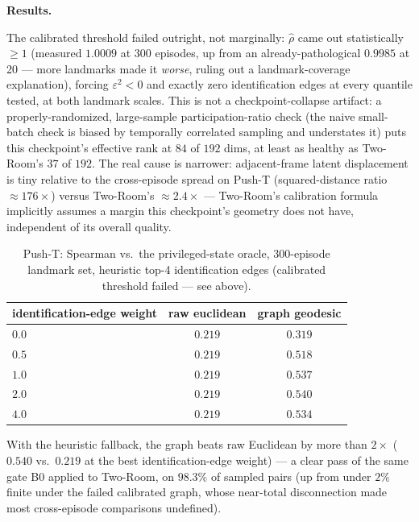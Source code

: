 \documentclass[11pt]{article}
\begin{document}
\textbf{Results.}

The calibrated threshold failed outright, not marginally: $\hat\rho$ came out statistically
$\ge 1$ (measured $1.0009$ at 300 episodes, up from an already-pathological $0.9985$ at 20 ---
more landmarks made it \emph{worse}, ruling out a landmark-coverage explanation), forcing
$\varepsilon^2 < 0$ and exactly zero identification edges at every quantile tested, at both
landmark scales. This is not a checkpoint-collapse artifact: a properly-randomized,
large-sample participation-ratio check (the naive small-batch check is biased by temporally
correlated sampling and understates it) puts this checkpoint's effective rank at $84$ of $192$
dims, at least as healthy as Two-Room's $37$ of $192$. The real cause is narrower: adjacent-frame
latent displacement is tiny relative to the cross-episode spread on Push-T (squared-distance
ratio $\approx 176\times$) versus Two-Room's $\approx 2.4\times$ --- Two-Room's calibration
formula implicitly assumes a margin this checkpoint's geometry does not have, independent of its
overall quality.

\begin{table}[h]
\centering
\small
\caption{Push-T: Spearman vs.\ the privileged-state oracle, 300-episode landmark set,
heuristic top-4 identification edges (calibrated threshold failed --- see above).}
\begin{tabular}{lcc}
\toprule
identification-edge weight & raw euclidean & \textbf{graph geodesic} \\
\midrule
$0.0$ & $0.219$ & $0.319$ \\
$0.5$ & $0.219$ & $0.518$ \\
$1.0$ & $0.219$ & $0.537$ \\
$2.0$ & $0.219$ & $\mathbf{0.540}$ \\
$4.0$ & $0.219$ & $0.534$ \\
\bottomrule
\end{tabular}
\end{table}

With the heuristic fallback, the graph beats raw Euclidean by more than $2\times$ ($0.540$ vs.\
$0.219$ at the best identification-edge weight) --- a clear pass of the same gate B0 applied to
Two-Room, on $98.3\%$ of sampled pairs (up from under $2\%$ finite under the failed calibrated
graph, whose near-total disconnection made most cross-episode comparisons undefined).
\end{document}
